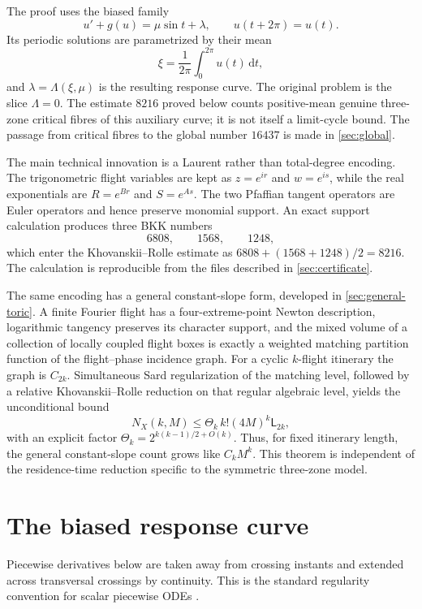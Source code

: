\documentclass[11pt]{article}
\newcommand{\dd}{\,\mathrm d}
\begin{document}
The proof uses the biased family
\begin{equation}\label{eq:biased}
 u'+g(u)=\mu\sin t+\lambda,
 \qquad u(t+2\pi)=u(t).
\end{equation}
Its periodic solutions are parametrized by their mean
\[
 \xi=\frac1{2\pi}\int_0^{2\pi}u(t)\dd t,
\]
and $\lambda=\Lambda(\xi,\mu)$ is the resulting response curve.  The original problem is the slice $\Lambda=0$.  The estimate $8216$ proved below counts positive-mean genuine three-zone critical fibres of this auxiliary curve; it is not itself a limit-cycle bound.  The passage from critical fibres to the global number $16437$ is made in \cref{sec:global}.

The main technical innovation is a Laurent rather than total-degree encoding.  The trigonometric flight variables are kept as $z=e^{ir}$ and $w=e^{is}$, while the real exponentials are $R=e^{Br}$ and $S=e^{As}$.  The two Pfaffian tangent operators are Euler operators and hence preserve monomial support.  An exact support calculation produces three BKK numbers
\[
 6808,\qquad1568,\qquad1248,
\]
which enter the Khovanskii--Rolle estimate as $6808+(1568+1248)/2=8216$.  The calculation is reproducible from the files described in \cref{sec:certificate}.

The same encoding has a general constant-slope form, developed in \cref{sec:general-toric}.  A finite Fourier flight has a four-extreme-point Newton description, logarithmic tangency preserves its character support, and the mixed volume of a collection of locally coupled flight boxes is exactly a weighted matching partition function of the flight--phase incidence graph.  For a cyclic $k$-flight itinerary the graph is $C_{2k}$.  Simultaneous Sard regularization of the matching level, followed by a relative Khovanskii--Rolle reduction on that regular algebraic level, yields the unconditional bound
\[
 N_X(k,M)\le\Theta_k\,k!(4M)^k\mathsf L_{2k},
\]
with an explicit factor \(\Theta_k=2^{k(k-1)/2+O(k)}\).  Thus, for fixed itinerary length, the general constant-slope count grows like \(C_kM^k\).  This theorem is independent of the residence-time reduction specific to the symmetric three-zone model.

\section{The biased response curve}\label{sec:response}

Piecewise derivatives below are taken away from crossing instants and extended across transversal crossings by continuity.  This is the standard regularity convention for scalar piecewise ODEs \cite{BravoFernandezTineo2007}.
\end{document}
